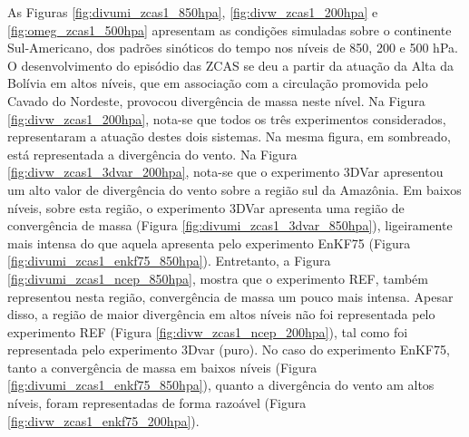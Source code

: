 As Figuras \ref{fig:divumi_zcas1_850hpa}, \ref{fig:divw_zcas1_200hpa} e \ref{fig:omeg_zcas1_500hpa} apresentam as condições simuladas sobre o continente Sul-Americano, dos padrões sinóticos do tempo nos níveis de 850, 200 e 500 hPa. O desenvolvimento do episódio das ZCAS se deu a partir da atuação da Alta da Bolívia em altos níveis, que em associação com a circulação promovida pelo Cavado do Nordeste, provocou divergência de massa neste nível. Na Figura \ref{fig:divw_zcas1_200hpa}, nota-se que todos os três experimentos considerados, representaram a atuação destes dois sistemas. Na mesma figura, em sombreado, está representada a divergência do vento. Na Figura \ref{fig:divw_zcas1_3dvar_200hpa}, nota-se que o experimento 3DVar apresentou um alto valor de divergência do vento sobre a região sul da Amazônia. Em baixos níveis, sobre esta região, o experimento 3DVar apresenta uma região de convergência de massa (Figura \ref{fig:divumi_zcas1_3dvar_850hpa}), ligeiramente mais intensa do que aquela apresenta pelo experimento EnKF75 (Figura \ref{fig:divumi_zcas1_enkf75_850hpa}). Entretanto, a Figura \ref{fig:divumi_zcas1_ncep_850hpa}, mostra que o experimento REF, também representou nesta região, convergência de massa um pouco mais intensa. Apesar disso, a região de maior divergência em altos níveis não foi representada pelo experimento REF (Figura \ref{fig:divw_zcas1_ncep_200hpa}), tal como foi representada pelo experimento 3Dvar (puro). No caso do experimento EnKF75, tanto a convergência de massa em baixos níveis (Figura \ref{fig:divumi_zcas1_enkf75_850hpa}), quanto a divergência do vento am altos níveis, foram representadas de forma razoável (Figura \ref{fig:divw_zcas1_enkf75_200hpa}).

